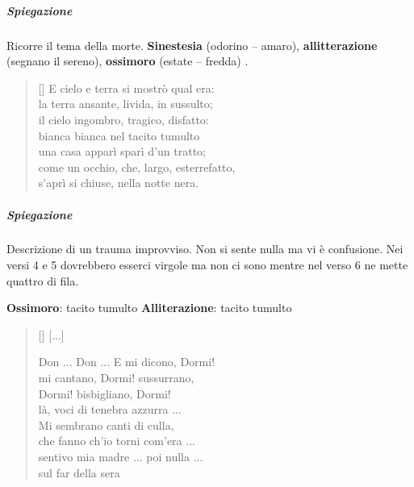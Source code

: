\documentclass[10pt]{report}
\begin{document}
		\subparagraph[Novembre]{Spiegazione}Ricorre il tema della morte.
		\textbf{Sinestesia} (odorino – amaro), \textbf{allitterazione} (segnano il sereno), \textbf{ossimoro} (estate – fredda) .
	
		
		
		\renewcommand{\poemtoc}{subsection}
		\settowidth{\versewidth}{There was an old party of Lyme}
		
		\begin{verse}[\versewidth]
			E cielo e terra si mostrò qual era:\\
			la terra ansante, livida, in sussulto;\\
			il cielo ingombro, tragico, disfatto:\\
			bianca bianca nel tacito tumulto\\
			una casa apparì sparì d'un tratto;\\
			come un occhio, che, largo, esterrefatto,\\
			s'aprì si chiuse, nella notte nera.\\
			
		\end{verse}
		
		\subparagraph[Lampo]{Spiegazione}Descrizione di un trauma improvviso. Non si sente nulla ma vi è confusione. Nei versi 4 e 5 dovrebbero esserci virgole ma non ci sono mentre nel verso 6 ne mette quattro di fila.
		
		\textbf{Ossimoro}: tacito tumulto
		\textbf{Alliterazione}: tacito tumulto
		
		\renewcommand{\poemtoc}{subsection}
		\settowidth{\versewidth}{There was an old party of Lyme}
		
		\begin{verse}[\versewidth]
			[...]
			
			Don ... Don ... E mi dicono, Dormi!\\
			mi cantano, Dormi! sussurrano,\\
			Dormi! bisbigliano, Dormi!\\
			là, voci di tenebra azzurra ...\\
			Mi sembrano canti di culla,\\
			che fanno ch'io torni com'era ...\\
			sentivo mia madre ... poi nulla ...\\
			sul far della sera\\
			
		\end{verse}
		
\end{document}

